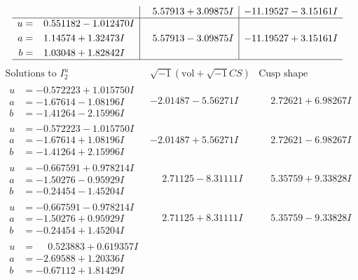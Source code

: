 \documentclass[1p]{elsarticle_modified}
\theoremstyle{definition}
\newcommand{\I}{\sqrt{-1}}
\begin{document}
$$\begin{array}{c|c|c}
 & \phantom{-}5.57913 + 3.09875 I & -11.19527 - 3.15161 I \\ \hline\begin{aligned}
u &= \phantom{-}0.551182 - 1.012470 I \\
a &= \phantom{-}1.14574 + 1.32473 I \\
b &= \phantom{-}1.03048 + 1.82842 I\end{aligned}
 & \phantom{-}5.57913 - 3.09875 I & -11.19527 + 3.15161 I\\
 \hline 
 \end{array}$$\newpage$$\begin{array}{c|c|c}  
\text{Solutions to }I^u_{2}& \I (\text{vol} + \sqrt{-1}CS) & \text{Cusp shape}\\
 \hline 
\begin{aligned}
u &= -0.572223 + 1.015750 I \\
a &= -1.67614 - 1.08196 I \\
b &= -1.41264 - 2.15996 I\end{aligned}
 & -2.01487 - 5.56271 I & \phantom{-}2.72621 + 6.98267 I \\ \hline\begin{aligned}
u &= -0.572223 - 1.015750 I \\
a &= -1.67614 + 1.08196 I \\
b &= -1.41264 + 2.15996 I\end{aligned}
 & -2.01487 + 5.56271 I & \phantom{-}2.72621 - 6.98267 I \\ \hline\begin{aligned}
u &= -0.667591 + 0.978214 I \\
a &= -1.50276 - 0.95929 I \\
b &= -0.24454 - 1.45204 I\end{aligned}
 & \phantom{-}2.71125 - 8.31111 I & \phantom{-}5.35759 + 9.33828 I \\ \hline\begin{aligned}
u &= -0.667591 - 0.978214 I \\
a &= -1.50276 + 0.95929 I \\
b &= -0.24454 + 1.45204 I\end{aligned}
 & \phantom{-}2.71125 + 8.31111 I & \phantom{-}5.35759 - 9.33828 I \\ \hline\begin{aligned}
u &= \phantom{-}0.523883 + 0.619357 I \\
a &= -2.69588 + 1.20336 I \\
b &= -0.67112 + 1.81429 I\end{aligned}

\end{array}$$
\end{document}
